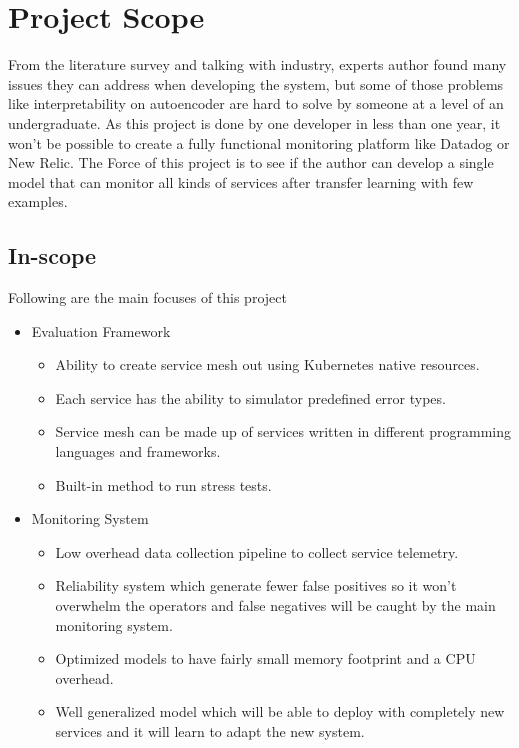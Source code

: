 \section{Project Scope}

From the literature survey and talking with industry, experts author found many issues they can address when developing the system, but some of those problems like interpretability on autoencoder \citep{ribeiro2016should} are hard to solve by someone at a level of an undergraduate. As this project is done by one developer in less than one year, it won't be possible to create a fully functional monitoring platform like Datadog or New Relic. The Force of this project is to see if the author can develop a single model that can monitor all kinds of services after transfer learning with few examples. \\


\subsection{In-scope} \label{sec:in-scope}
Following are the main focuses of this project
\begin{itemize}[noitemsep,nolistsep] 
    \item Evaluation Framework
    \begin{itemize}[noitemsep,nolistsep] 
        \item Ability to create service mesh out using Kubernetes native resources.
        \item Each service has the ability to simulator predefined error types.
        \item Service mesh can be made up of services written in different programming languages and  frameworks.
        \item Built-in method to run stress tests.
    \end{itemize}
    \item Monitoring System
    \begin{itemize}[noitemsep,nolistsep]
        \item Low overhead data collection pipeline to collect service telemetry.
        \item Reliability system which generate fewer false positives so it won't overwhelm the operators and false negatives will be caught by the main monitoring system.
        \item Optimized models to have fairly small memory footprint and a CPU overhead.
        \item Well generalized model which will be able to deploy with completely new services and it will learn to adapt the new system.
    \end{itemize}
\end{itemize}


